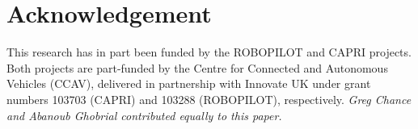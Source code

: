 \documentclass[runningheads,twocolumn,a4paper,10pt]{llncs}
\begin{document}
\section*{Acknowledgement}
This research has in part been funded by the ROBOPILOT and CAPRI projects. Both projects are part-funded by the Centre for Connected and Autonomous Vehicles (CCAV), delivered in partnership with Innovate UK under grant numbers 103703 (CAPRI) and 103288 (ROBOPILOT), respectively.
%
\textit{Greg Chance and Abanoub Ghobrial contributed equally to this paper.}
\balance

\printbibliography
\end{document}

